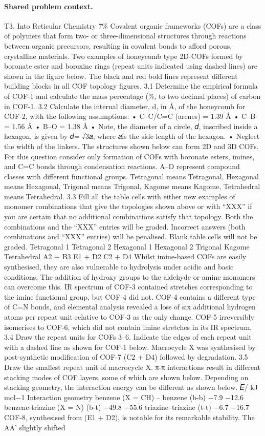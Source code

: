 \paragraph{Shared problem context.}
T3. Into Reticular Chemistry 7\% Covalent organic frameworks (COFs) are a class of polymers that form two- or three-dimensional structures through reactions between organic precursors, resulting in covalent bonds to afford porous, crystalline materials. Two examples of honeycomb type 2D-COFs formed by boronate ester and boroxine rings (repeat units indicated using dashed lines) are shown in the figure below. The black and red bold lines represent different building blocks in all COF topology figures. 3.1 Determine the empirical formula of COF-1 and calculate the mass percentage (\%, to two decimal places) of carbon in COF-1. 3.2 Calculate the internal diameter, d, in Å, of the honeycomb for COF-2, with the following assumptions: • C–C/C=C (arenes) = 1.39 Å • C–B = 1.56 Å • B–O = 1.38 Å • Note, the diameter of a circle, 𝑑, inscribed inside a hexagon, is given by 𝑑= √3𝑎, where 𝑎is the side length of the hexagon. • Neglect the width of the linkers. The structures shown below can form 2D and 3D COFs. For this question consider only formation of COFs with boronate esters, imines, and C=C bonds through condensation reactions. A–D represent compound classes with different functional groups. Tetragonal means Tetragonal, Hexagonal means Hexagonal, Trigonal means Trigonal, Kagome means Kagome, Tetrahedral means Tetrahedral. 3.3 Fill all the table cells with either new examples of monomer combinations that give the topologies shown above or with “XXX” if you are certain that no additional combinations satisfy that topology. Both the combinations and the “XXX” entries will be graded. Incorrect answers (both combinations and “XXX” entries) will be penalised. Blank table cells will not be graded. Tetragonal 1 Tetragonal 2 Hexagonal 1 Hexagonal 2 Trigonal Kagome Tetrahedral A2 + B3 E1 + D2 C2 + D4 Whilst imine-based COFs are easily synthesised, they are also vulnerable to hydrolysis under acidic and basic conditions. The addition of hydroxy groups to the aldehyde or amine monomers can overcome this. IR spectrum of COF-3 contained stretches corresponding to the imine functional group, but COF-4 did not. COF-4 contains a different type of C=N bonds, and elemental analysis revealed a loss of six additional hydrogen atoms per repeat unit relative to COF-3 as the only change. COF-5 irreversibly isomerises to COF-6, which did not contain imine stretches in its IR spectrum. 3.4 Draw the repeat units for COFs 3–6. Indicate the edges of each repeat unit with a dashed line as shown for COF-1 below. Macrocycle X was synthesised by post-synthetic modification of COF-7 (C2 + D4) followed by degradation. 3.5 Draw the smallest repeat unit of macrocycle X. π-π interactions result in different stacking modes of COF layers, some of which are shown below. Depending on stacking geometry, the interaction energy can be different as shown below. 𝐸/ kJ mol−1 Interaction geometry benzene (X = CH) – benzene (b-b) −7.9 −12.6 benzene-triazine (X = N) (b-t) −49.8 −55.6 triazine–triazine (t-t) −6.7 −16.7 COF-8, synthesised from (E1 + D2), is notable for its remarkable stability. The AA' slightly shifted 
